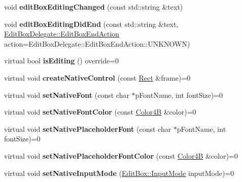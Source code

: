 \begin{DoxyCompactItemize}
void {\bfseries edit\+Box\+Editing\+Changed} (const std\+::string \&text)
\item 
\mbox{\label{classui_1_1EditBoxImplCommon_ad7ac71b6e44527ef899e1ec0836baca6}} 
void {\bfseries edit\+Box\+Editing\+Did\+End} (const std\+::string \&text, \hyperlink{classui_1_1EditBoxDelegate_ae7285a0cdbe2f2daf0557c97dba0bdb5}{Edit\+Box\+Delegate\+::\+Edit\+Box\+End\+Action} action=Edit\+Box\+Delegate\+::\+Edit\+Box\+End\+Action\+::\+U\+N\+K\+N\+O\+WN)
\item 
\mbox{\label{classui_1_1EditBoxImplCommon_adfce3b9c52fb6bcb411883ca93276c2e}} 
virtual bool {\bfseries is\+Editing} () override=0
\item 
\mbox{\label{classui_1_1EditBoxImplCommon_a44458381e57953414f07c15241fb2c2a}} 
virtual void {\bfseries create\+Native\+Control} (const \hyperlink{classRect}{Rect} \&frame)=0
\item 
\mbox{\label{classui_1_1EditBoxImplCommon_a5940a3829aa418b940e95706c75862fc}} 
virtual void {\bfseries set\+Native\+Font} (const char $\ast$p\+Font\+Name, int font\+Size)=0
\item 
\mbox{\label{classui_1_1EditBoxImplCommon_a258505288a3a49a007d0e5fc72369aae}} 
virtual void {\bfseries set\+Native\+Font\+Color} (const \hyperlink{structColor4B}{Color4B} \&color)=0
\item 
\mbox{\label{classui_1_1EditBoxImplCommon_af4db6938a72cf224f975892b9b0468b1}} 
virtual void {\bfseries set\+Native\+Placeholder\+Font} (const char $\ast$p\+Font\+Name, int font\+Size)=0
\item 
\mbox{\label{classui_1_1EditBoxImplCommon_a9f3f493c2d2fee06c375e011e61db671}} 
virtual void {\bfseries set\+Native\+Placeholder\+Font\+Color} (const \hyperlink{structColor4B}{Color4B} \&color)=0
\item 
\mbox{\label{classui_1_1EditBoxImplCommon_a7df198dc2dad0413a75f4ad43e0f0c63}} 
virtual void {\bfseries set\+Native\+Input\+Mode} (\hyperlink{classui_1_1EditBox_a7a1bfe8f3ba218bedfcf5451ec3ce01a}{Edit\+Box\+::\+Input\+Mode} input\+Mode)=0

\end{DoxyCompactItemize}

